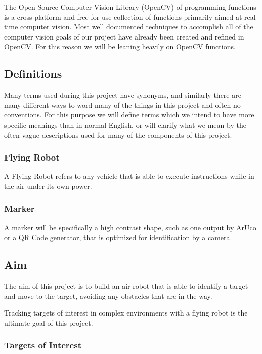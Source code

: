 \documentclass{article}
\begin{document}
		The Open Source Computer Vision Library (OpenCV) of programming functions is a cross-platform and free for use collection of functions primarily aimed at real-time computer vision\cite{opencv}. Most well documented techniques to accomplish all of the computer vision goals of our project have already been created and refined in OpenCV. For this reason we will be leaning heavily on OpenCV functions.
		
		
	\subsection{Definitions}
	
	Many terms used during this project have synonyms, and similarly there are many different ways to word many of the things in this project and often no conventions. For this purpose we will define terms which we intend to have more specific meanings than in normal English, or will clarify what we mean by the often vague descriptions used for many of the components of this project.
	
		\subsubsection{Flying Robot}
		
		A Flying Robot refers to any vehicle that is able to execute instructions while in the air under its own power.
		
		\subsubsection{Marker}
		
		A marker will be specifically a high contrast shape, such as one output by ArUco or a QR Code generator, that is optimized for identification by a camera.
		
	\subsection{Aim}
	
	The aim of this project is to build an air robot that is able to identify a target and move to the target, avoiding any obstacles that are in the way. 
	
	Tracking targets of interest in complex environments with a flying robot is the ultimate goal of this project. 
	
		\subsubsection{Targets of Interest}
		
\end{document}
